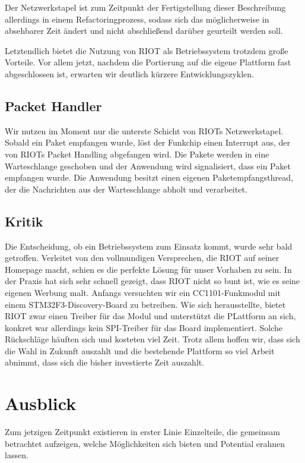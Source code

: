 \documentclass{IEEEtran}
\begin{document}
        Der Netzwerkstapel ist zum Zeitpunkt der Fertigstellung dieser
        Beschreibung allerdings in einem Refactoringprozess,
        sodass sich das möglicherweise in absehbarer Zeit ändert und nicht
        abschließend darüber geurteilt werden soll.

        Letztendlich bietet die Nutzung von RIOT als Betriebssystem trotzdem
        große Vorteile. Vor allem jetzt, nachdem die Portierung auf die eigene
        Plattform fast abgeschlossen ist, erwarten wir deutlich kürzere
        Entwicklungszyklen.

    \subsection{Packet Handler}
        Wir nutzen im Moment nur die unterste Schicht von RIOTs Netzwerkstapel.
        Sobald ein Paket empfangen wurde, löst der Funkchip einen Interrupt aus,
        der von RIOTs Packet Handling abgefangen wird. Die Pakete werden in eine
        Warteschlange geschoben und der Anwendung wird signalisiert,
        dass ein Paket empfangen wurde.
        Die Anwendung besitzt einen eigenen Paketempfangsthread,
        der die Nachrichten aus der Warteschlange abholt und verarbeitet.


    \subsection{Kritik}
        Die Entscheidung, ob ein Betriebssystem zum Einsatz kommt,
        wurde sehr bald getroffen. Verleitet von den vollmundigen Versprechen,
        die RIOT auf seiner Homepage macht, schien es die perfekte Lösung für
        unser Vorhaben zu sein. In der Praxis hat sich sehr schnell gezeigt,
        dass RIOT nicht so bunt ist, wie es seine eigenen Werbung malt.
        Anfangs versuchten wir ein CC1101-Funkmodul mit einem
        STM32F3-Discovery-Board zu betreiben. Wie sich herausstellte,
        bietet RIOT zwar einen Treiber für das Modul und unterstützt die
        PLattform an sich, konkret war allerdings kein SPI-Treiber für das Board
        implementiert. Solche Rückschläge häuften sich und kosteten viel Zeit.
        Trotz allem hoffen wir, dass sich die Wahl in Zukunft auszahlt und
        die bestehende Plattform so viel Arbeit abnimmt, dass sich die
        bisher investierte Zeit auszahlt.


\section{Ausblick}
    Zum jetzigen Zeitpunkt existieren in erster Linie Einzelteile,
    die gemeinsam betrachtet aufzeigen, welche Möglichkeiten sich bieten
    und Potential erahnen lassen.
\end{document}

